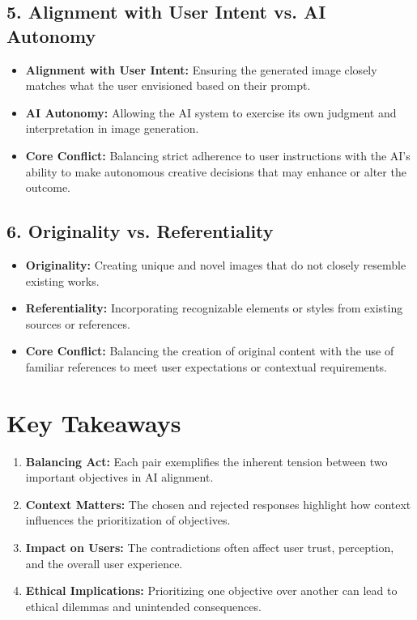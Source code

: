 \subsection{5. Alignment with User Intent vs. AI Autonomy}
\begin{itemize}
    \item \textbf{Alignment with User Intent:} Ensuring the generated image closely matches what the user envisioned based on their prompt.
    \item \textbf{AI Autonomy:} Allowing the AI system to exercise its own judgment and interpretation in image generation.
    \item \textbf{Core Conflict:} Balancing strict adherence to user instructions with the AI’s ability to make autonomous creative decisions that may enhance or alter the outcome.
\end{itemize}

\subsection{6. Originality vs. Referentiality}
\begin{itemize}
    \item \textbf{Originality:} Creating unique and novel images that do not closely resemble existing works.
    \item \textbf{Referentiality:} Incorporating recognizable elements or styles from existing sources or references.
    \item \textbf{Core Conflict:} Balancing the creation of original content with the use of familiar references to meet user expectations or contextual requirements.
\end{itemize}

\section{Key Takeaways}

\begin{enumerate}
    \item \textbf{Balancing Act:} Each pair exemplifies the inherent tension between two important objectives in AI alignment.
    \item \textbf{Context Matters:} The chosen and rejected responses highlight how context influences the prioritization of objectives.
    \item \textbf{Impact on Users:} The contradictions often affect user trust, perception, and the overall user experience.
    \item \textbf{Ethical Implications:} Prioritizing one objective over another can lead to ethical dilemmas and unintended consequences.
\end{enumerate}

